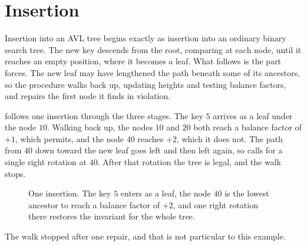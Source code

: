 \section{Insertion}
\label{sec:insertion}

Insertion into an AVL tree begins exactly as insertion into an ordinary binary
search tree. The new key descends from the root, comparing at each node, until it
reaches an empty position, where it becomes a leaf. What follows is the part
 forces. The new leaf may have lengthened the path beneath some of
its ancestors, so the procedure walks back up, updating heights and testing
balance factors, and repairs the first node it finds in violation.

\begin{algorithm}[t]
\caption{Insertion. The recursion descends to the insertion point and rebalances
on the way back out, so every node on the search path is repaired after its
children and before its parent.}
\label{alg:insert}
\end{algorithm}

 follows one insertion through the three stages. The key
$5$ arrives as a leaf under the node $10$. Walking back up, the nodes $10$ and
$20$ both reach a balance factor of $+1$, which  permits, and the
node $40$ reaches $+2$, which it does not. The path from $40$ down toward the new
leaf goes left and then left again, so  calls for a single right
rotation at $40$. After that rotation the tree is legal, and the walk stops.

\begin{figure}[t]
  \centering
  
  \caption{One insertion. The key $5$ enters as a leaf, the node $40$ is the
  lowest ancestor to reach a balance factor of $+2$, and one right rotation there
  restores the invariant for the whole tree.}
  \label{fig:inserttrace}
\end{figure}

The walk stopped after one repair, and that is not particular to this example.

